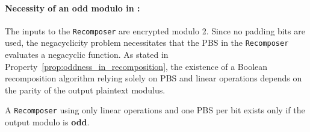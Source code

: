 \paragraph{Necessity of an odd modulo in \SubBytes:} 
The inputs to the \texttt{Recomposer} are encrypted modulo 2. Since no padding bits are used, the negacyclicity problem necessitates that the PBS in the \texttt{Recomposer} evaluates a negacyclic function. As stated in Property~\ref{prop:oddness_in_recomposition}, the existence of a Boolean recomposition algorithm relying solely on PBS and linear operations depends on the parity of the output plaintext modulus.

\begin{property}
    A \texttt{Recomposer} using only linear operations and one PBS per bit exists only if the output modulo is \textbf{odd}.
    \label{prop:oddness_in_recomposition}
\end{property}


